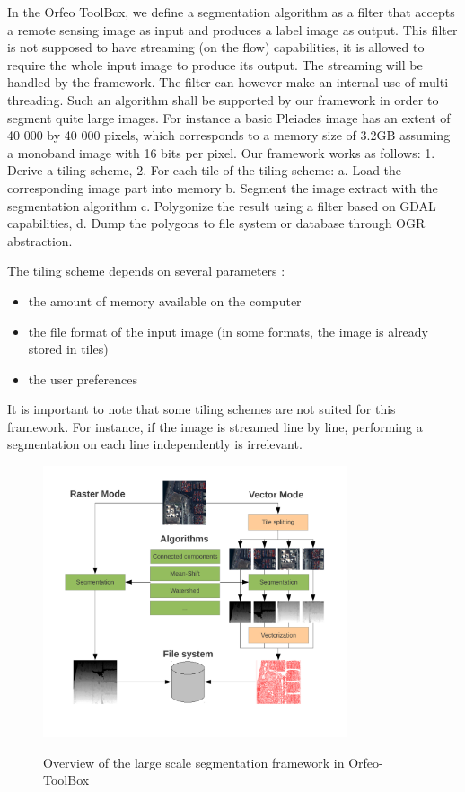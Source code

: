 \documentclass{josis}
\begin{document}
In the Orfeo ToolBox, we define a segmentation algorithm as a filter
that accepts a remote sensing image as input and produces a label
image as output. This filter is not supposed to have streaming (on the
flow) capabilities, it is allowed to require the whole input image to
produce its output. The streaming will be handled by the framework. The
filter can however make an internal use of multi-threading. 
Such an algorithm shall be supported by our framework in order to
segment quite large images. For instance a basic Pleiades image 
\cite{} has an extent of 40 000 by 40 000 pixels, which corresponds to
a memory size of 3.2GB assuming a monoband image with 16 bits per pixel.
Our framework works as follows:
1. Derive a tiling scheme, 
2. For each tile of the tiling scheme:
   a. Load the corresponding image part into memory
   b. Segment the image extract with the segmentation algorithm
   c. Polygonize the result using a filter based on GDAL capabilities,
   d. Dump the polygons to file system or database through OGR
      abstraction.

The tiling scheme depends on several parameters :
\begin{itemize}
\item the amount of memory available on the computer
\item the file format of the input image (in some formats, 
the image is already stored in tiles)
\item the user preferences
\end{itemize}
It is important to note that some tiling schemes are not suited for this
framework. For instance, if the image is streamed line by line, performing 
a segmentation on each line independently is irrelevant.

\begin{figure}[!htb]
\centering
\includegraphics[width=0.8\textwidth]{Pictures/schema_ogrs}\label{fig:overview}
\caption{Overview of the large scale segmentation framework in Orfeo-ToolBox}
\end{figure}
\end{document}

